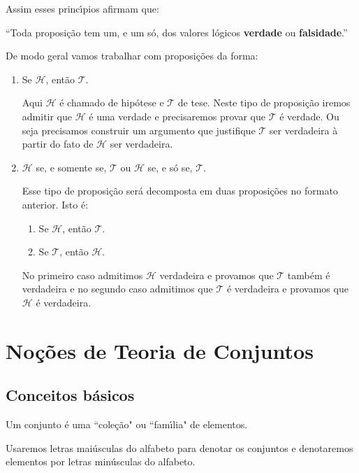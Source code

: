 Assim esses princ{\'\i}pios afirmam que:
\begin{center}
	``Toda proposi\c{c}\~ao tem um, e um s\'o, dos valores l\'ogicos \textbf{verdade} ou \textbf{falsidade}.''
\end{center}

De modo geral vamos trabalhar com proposi\c{c}\~oes da forma:
\begin{enumerate}
	\item Se $\mathcal{H}$, ent\~ao $\mathcal{T}$.

	Aqui $\mathcal{H}$ \'e chamado de hip\'otese e $\mathcal{T}$ de tese. Neste tipo de proposi\c{c}\~ao iremos admitir que $\mathcal{H}$ \'e uma verdade e precisaremos provar que $\mathcal{T}$ \'e verdade. Ou seja precisamos construir um argumento que justifique $\mathcal{T}$ ser verdadeira \`a partir do fato de $\mathcal{H}$ ser verdadeira.

	\item $\mathcal{H}$ se, e somente se, $\mathcal{T}$ ou $\mathcal{H}$ se, e s\'o se, $\mathcal{T}$.

	Esse tipo de proposi\c{c}\~ao ser\'a decomposta em duas proposi\c{c}\~oes no formato anterior. Isto \'e:
	\begin{enumerate}
		\item Se $\mathcal{H}$, ent\~ao $\mathcal{T}$.
		\item Se $\mathcal{T}$, ent\~ao $\mathcal{H}$.
	\end{enumerate}

	No primeiro caso admitimos $\mathcal{H}$ verdadeira e provamos que $\mathcal{T}$ tamb\'em \'e verdadeira e no segundo caso admitimos que $\mathcal{T}$ \'e verdadeira e provamos que $\mathcal{H}$ \'e verdadeira.
\end{enumerate}


\chapter{No{\c c}{\~o}es de Teoria de Conjuntos}
\section{Conceitos b{\'a}sicos}

Um conjunto {\'e} uma ``cole{\c c}{\~a}o" ou ``fam{\'\i}lia" de elementos.

Usaremos letras mai{\'u}sculas do alfabeto para denotar os conjuntos e denotaremos elementos por letras min{\'u}sculas do alfabeto.

